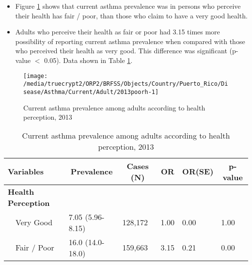  \begin{itemize}

\item Figure \ref{fig:fairpoor.Asthma.2013} shows that current asthma prevalence  was 
 in persons who perceive their health has fair / poor,
than those who claim to have a very good health.

\item Adults who perceive their health as fair or poor had 3.15 times more possibility of reporting current asthma prevalence when compared with those who perceived their health as very good. This difference was significant (p-value $<$ 0.05). Data shown in Table \ref{tab:fairpoor.Asthma.2013}.

\end{itemize}

\begin{figure}[H]
\caption{Current asthma prevalence among adults according to health perception,
         2013}
\label{fig:fairpoor.Asthma.2013}

\begin{knitrout}
\color{fgcolor}

{\centering \texttt{[image: /media/truecrypt2/ORP2/BRFSS/Objects/Country/Puerto\_Rico/Disease/Asthma/Current/Adult/2013poorh-1]} 

}



\end{knitrout}
 \end{figure}

\begin{table}[H]
\caption{Current asthma prevalence  among adults according to health perception, 2013\label{tab:fairpoor.Asthma.2013}} 
\begin{center}
\begin{tabular}{llllll}
\hline\hline
\multicolumn{1}{l}{Variables}&\multicolumn{1}{c}{Prevalence}&\multicolumn{1}{c}{Cases (N)}&\multicolumn{1}{c}{OR}&\multicolumn{1}{c}{OR(SE)}&\multicolumn{1}{c}{p-value}\tabularnewline
\hline
{\bfseries Health Perception}&&&&&\tabularnewline
~~Very Good&7.05 (5.96-8.15)&128,172&1.00&0.00&1.00\tabularnewline
~~Fair / Poor&16.0 (14.0-18.0)&159,663&3.15&0.21&0.00\tabularnewline
\hline
\end{tabular}\end{center}

\end{table}

